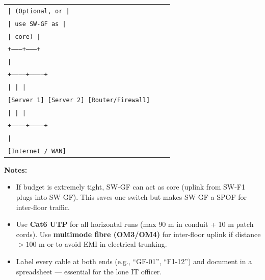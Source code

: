 \documentclass[11pt]{article}
\begin{document}
\begin{exoresolu}
\begin{center}
\begin{tabular}{|p{0.9\linewidth}|}
\texttt{\hspace{2cm}|  (Optional, or   |}\\
\texttt{\hspace{2cm}|   use SW-GF as   |}\\
\texttt{\hspace{2cm}|   core)          |}\\
\texttt{\hspace{2cm}+--------+--------+}\\
\texttt{\hspace{3.5cm}|}\\
\texttt{\hspace{1.5cm}+------------+------------+}\\
\texttt{\hspace{1.5cm}|            |            |}\\
\texttt{\hspace{1.5cm}[Server 1] [Server 2] [Router/Firewall]}\\
\texttt{\hspace{1.5cm}|            |            |}\\
\texttt{\hspace{1.5cm}+------------+------------+}\\
\texttt{\hspace{3.5cm}|}\\
\texttt{\hspace{3.5cm}[Internet / WAN]}\\\hline
\end{tabular}
\end{center}

\textbf{Notes:}
\begin{itemize}
\item If budget is extremely tight, SW-GF can act as core (uplink from SW-F1 plugs into SW-GF). This saves one switch but makes SW-GF a SPOF for inter-floor traffic.
\item Use \textbf{Cat6 UTP} for all horizontal runs (max 90 m in conduit + 10 m patch cords). Use \textbf{multimode fibre (OM3/OM4)} for inter-floor uplink if distance $>100$ m or to avoid EMI in electrical trunking.
\item Label every cable at both ends (e.g., ``GF-01'', ``F1-12'') and document in a spreadsheet — essential for the lone IT officer.
\end{itemize}
\end{exoresolu}
\end{document}
